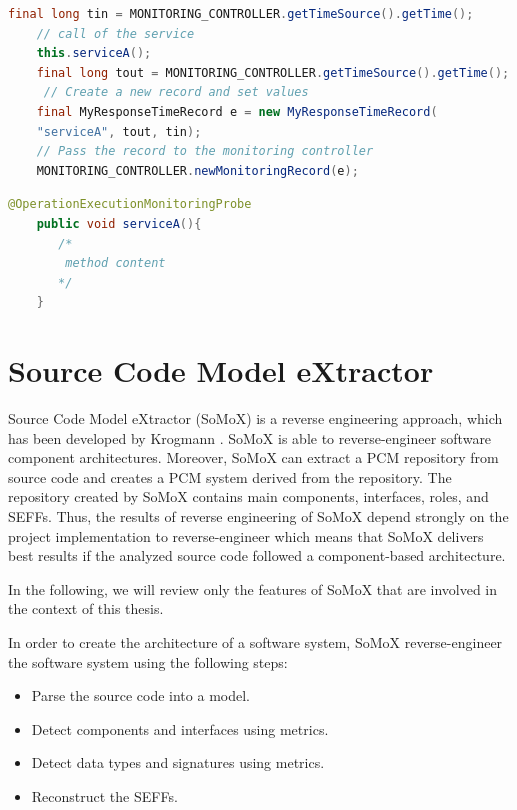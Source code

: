 \begin{lstlisting}[caption={Example of manual instrumentation of source code},label={lst:kieker_manual_instr}, captionpos=b, language=java] 
    final long tin = MONITORING_CONTROLLER.getTimeSource().getTime();
    // call of the service
    this.serviceA();
    final long tout = MONITORING_CONTROLLER.getTimeSource().getTime();
     // Create a new record and set values
    final MyResponseTimeRecord e = new MyResponseTimeRecord(
    "serviceA", tout, tin);
    // Pass the record to the monitoring controller
    MONITORING_CONTROLLER.newMonitoringRecord(e);
\end{lstlisting}


\begin{lstlisting}[caption={Example of a Kieker Probe using AOP},label={lst:kieker_aop_instr}, captionpos=b, language=java] 
    @OperationExecutionMonitoringProbe
    public void serviceA(){
       /*
        method content
       */
    }
\end{lstlisting}


\section{Source Code Model eXtractor}
\label{sec:Source Code Model eXtractor}
Source Code Model eXtractor (SoMoX) is a reverse engineering approach, which has been developed by Krogmann \cite{krogmann2012reconstruction}. SoMoX is able to reverse-engineer software component architectures. Moreover, SoMoX can extract a PCM repository from source code and creates a PCM system derived from the repository. The repository created by SoMoX contains main components, interfaces, roles, and SEFFs. Thus, the results of reverse engineering of SoMoX depend strongly on the project implementation to reverse-engineer which means that SoMoX delivers best results if the analyzed source code followed a component-based architecture.

In the following, we will review only the features of SoMoX that are involved in the context of this thesis. 

In order to create the architecture of a software system, SoMoX reverse-engineer the software system using the following steps:
\begin{itemize}
\item Parse the source code into a model.  
\item Detect components and interfaces using metrics.
\item Detect data types and signatures using metrics.
\item Reconstruct the SEFFs.
\end{itemize}

